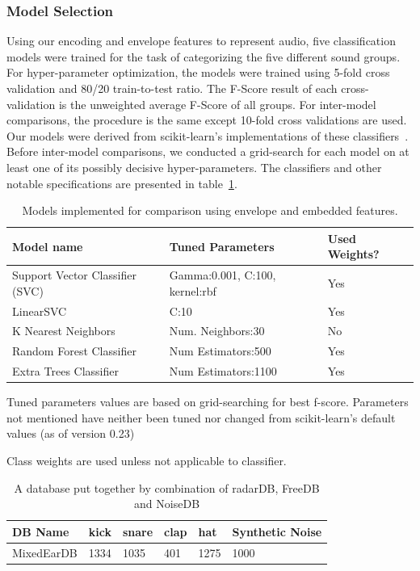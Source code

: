 \documentclass[runningheads,a4paper]{llncs}
\begin{document}
\begin{appendices}
\subsubsection{Model Selection}
Using our encoding and envelope features to represent audio, five classification models were trained for the task of categorizing the five different sound groups. For hyper-parameter optimization, the models were trained using 5-fold cross validation and 80/20 train-to-test ratio. The F-Score result of each cross-validation is the unweighted average F-Score of all groups. For inter-model comparisons, the procedure is the same except 10-fold cross validations are used. Our models were derived from scikit-learn's implementations of these classifiers~\cite{pedregosa2011scikit}. Before inter-model comparisons, we conducted a grid-search for each model on at least one of its possibly decisive hyper-parameters. The classifiers and other notable specifications are presented in table~\ref{table:mem_model_selection}. 
\begin{table}[t]
    \centering \hspace*{-0.8cm}
    \begin{threeparttable}
    \begin{tabular}[width=0.95\paperwidth]{|l|l|l|}
    \hline
    Model name & Tuned Parameters\tnote{\dag}  & Used Weights? \tnote{\ddag} \\\hline
     Support Vector Classifier (SVC) &  Gamma:0.001, C:100, kernel:rbf & Yes\\
     LinearSVC & C:10 & Yes\\
     K Nearest Neighbors & Num. Neighbors:30 &  No \\
     Random Forest Classifier & Num Estimators:500 & Yes \\
     Extra Trees Classifier & Num Estimators:1100 & Yes\\
     \hline
    \end{tabular}
    \caption{Models implemented for comparison using envelope and embedded features. }
    \begin{tablenotes}
    \item[\dag] Tuned parameters values are based on grid-searching for best f-score. Parameters not mentioned have neither been tuned nor changed from scikit-learn's default values (as of version 0.23)
    \item[\ddag] Class weights are used unless not applicable to classifier.
    \end{tablenotes}
    \label{table:mem_model_selection}
    \end{threeparttable}
\end{table}
\begin{table}[htbp]
\centering
\begin{tabular}{|l|l|l|l|l|l|}
\hline
 DB Name & kick & snare & clap & hat & Synthetic Noise\\\hline
 MixedEarDB & 1334 & 1035 & 401 & 1275 & 1000 \\ \hline
\end{tabular}
\caption{A database put together by combination of radarDB, FreeDB and NoiseDB}
\label{db:memDB}
\end{table}


\end{appendices}
\end{document}

